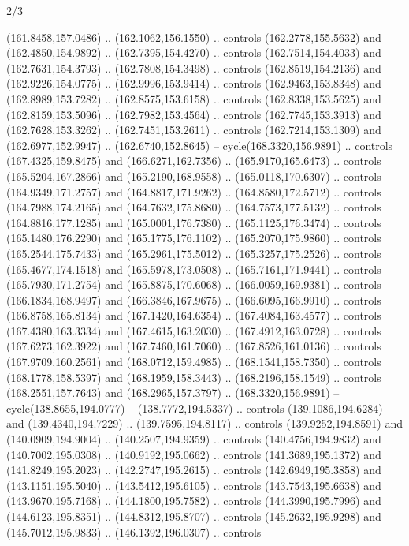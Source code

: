 \begin{flagdescription}{2/3}
\begin{scope}[shift={(0.5\flaglength,0.5)},scale=\flagwidth/320]
\begin{scope}[y=0.8pt, x=0.8pt, yscale=-1,shift={(-118.3,-146)}]
  (161.8458,157.0486) .. (162.1062,156.1550) .. controls (162.2778,155.5632) and
  (162.4850,154.9892) .. (162.7395,154.4270) .. controls (162.7514,154.4033) and
  (162.7631,154.3793) .. (162.7808,154.3498) .. controls (162.8519,154.2136) and
  (162.9226,154.0775) .. (162.9996,153.9414) .. controls (162.9463,153.8348) and
  (162.8989,153.7282) .. (162.8575,153.6158) .. controls (162.8338,153.5625) and
  (162.8159,153.5096) .. (162.7982,153.4564) .. controls (162.7745,153.3913) and
  (162.7628,153.3262) .. (162.7451,153.2611) .. controls (162.7214,153.1309) and
  (162.6977,152.9947) .. (162.6740,152.8645) -- cycle(168.3320,156.9891) ..
  controls (167.4325,159.8475) and (166.6271,162.7356) .. (165.9170,165.6473) ..
  controls (165.5204,167.2866) and (165.2190,168.9558) .. (165.0118,170.6307) ..
  controls (164.9349,171.2757) and (164.8817,171.9262) .. (164.8580,172.5712) ..
  controls (164.7988,174.2165) and (164.7632,175.8680) .. (164.7573,177.5132) ..
  controls (164.8816,177.1285) and (165.0001,176.7380) .. (165.1125,176.3474) ..
  controls (165.1480,176.2290) and (165.1775,176.1102) .. (165.2070,175.9860) ..
  controls (165.2544,175.7433) and (165.2961,175.5012) .. (165.3257,175.2526) ..
  controls (165.4677,174.1518) and (165.5978,173.0508) .. (165.7161,171.9441) ..
  controls (165.7930,171.2754) and (165.8875,170.6068) .. (166.0059,169.9381) ..
  controls (166.1834,168.9497) and (166.3846,167.9675) .. (166.6095,166.9910) ..
  controls (166.8758,165.8134) and (167.1420,164.6354) .. (167.4084,163.4577) ..
  controls (167.4380,163.3334) and (167.4615,163.2030) .. (167.4912,163.0728) ..
  controls (167.6273,162.3922) and (167.7460,161.7060) .. (167.8526,161.0136) ..
  controls (167.9709,160.2561) and (168.0712,159.4985) .. (168.1541,158.7350) ..
  controls (168.1778,158.5397) and (168.1959,158.3443) .. (168.2196,158.1549) ..
  controls (168.2551,157.7643) and (168.2965,157.3797) .. (168.3320,156.9891) --
  cycle(138.8655,194.0777) -- (138.7772,194.5337) .. controls
  (139.1086,194.6284) and (139.4340,194.7229) .. (139.7595,194.8117) .. controls
  (139.9252,194.8591) and (140.0909,194.9004) .. (140.2507,194.9359) .. controls
  (140.4756,194.9832) and (140.7002,195.0308) .. (140.9192,195.0662) .. controls
  (141.3689,195.1372) and (141.8249,195.2023) .. (142.2747,195.2615) .. controls
  (142.6949,195.3858) and (143.1151,195.5040) .. (143.5412,195.6105) .. controls
  (143.7543,195.6638) and (143.9670,195.7168) .. (144.1800,195.7582) .. controls
  (144.3990,195.7996) and (144.6123,195.8351) .. (144.8312,195.8707) .. controls
  (145.2632,195.9298) and (145.7012,195.9833) .. (146.1392,196.0307) .. controls

\end{scope}
\end{scope}
\end{flagdescription}
